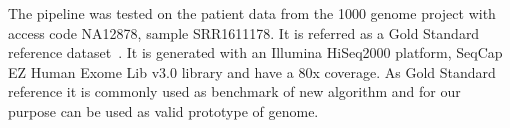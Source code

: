 \documentclass{standalone}
\begin{document}
The pipeline was tested on the patient data from the 1000 genome project with access code NA12878, sample SRR1611178.
It is referred as a Gold Standard reference dataset~\cite{Zook2014}.
It is generated with an Illumina HiSeq2000 platform, SeqCap EZ Human Exome Lib v3.0 library and have a 80x coverage.
As Gold Standard reference it is commonly used as benchmark of new algorithm and for our purpose can be used as valid prototype of genome.
\end{document}
